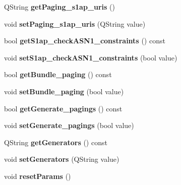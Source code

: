 \begin{DoxyCompactItemize}
\item 
Q\+String {\bfseries get\+Paging\+\_\+s1ap\+\_\+uris} ()\hypertarget{class_mme_a6144d91975d8be6b7b98890869d50aa0}{}\label{class_mme_a6144d91975d8be6b7b98890869d50aa0}

\item 
void {\bfseries set\+Paging\+\_\+s1ap\+\_\+uris} (Q\+String value)\hypertarget{class_mme_ac1810d48494dfe1fee05481bbff2b595}{}\label{class_mme_ac1810d48494dfe1fee05481bbff2b595}

\item 
bool {\bfseries get\+S1ap\+\_\+check\+A\+S\+N1\+\_\+constraints} () const \hypertarget{class_mme_ac06ce5b7fe9e9f6b692110ece42a1990}{}\label{class_mme_ac06ce5b7fe9e9f6b692110ece42a1990}

\item 
void {\bfseries set\+S1ap\+\_\+check\+A\+S\+N1\+\_\+constraints} (bool value)\hypertarget{class_mme_a630e8c6b0407e577f011a23b047130c2}{}\label{class_mme_a630e8c6b0407e577f011a23b047130c2}

\item 
bool {\bfseries get\+Bundle\+\_\+paging} () const \hypertarget{class_mme_a93121bdf9b0aefa8a26a4e2d219281e8}{}\label{class_mme_a93121bdf9b0aefa8a26a4e2d219281e8}

\item 
void {\bfseries set\+Bundle\+\_\+paging} (bool value)\hypertarget{class_mme_a3eb5c23486072e2e975fadc7d0911fe8}{}\label{class_mme_a3eb5c23486072e2e975fadc7d0911fe8}

\item 
bool {\bfseries get\+Generate\+\_\+pagings} () const \hypertarget{class_mme_af6ea4e538db1f852b94b20810f27dfa7}{}\label{class_mme_af6ea4e538db1f852b94b20810f27dfa7}

\item 
void {\bfseries set\+Generate\+\_\+pagings} (bool value)\hypertarget{class_mme_a42a31249a3e0c51c177b164855fcc848}{}\label{class_mme_a42a31249a3e0c51c177b164855fcc848}

\item 
Q\+String {\bfseries get\+Generators} () const \hypertarget{class_mme_afe11177f7eb96c21d7097b1750e3ed91}{}\label{class_mme_afe11177f7eb96c21d7097b1750e3ed91}

\item 
void {\bfseries set\+Generators} (Q\+String value)\hypertarget{class_mme_a8c75faaf58c0a33f12f68e81e886679d}{}\label{class_mme_a8c75faaf58c0a33f12f68e81e886679d}

\item 
void {\bfseries reset\+Params} ()\hypertarget{class_mme_a75c0bfe4dcb78eaa0aa6b141cfcd29a4}{}\label{class_mme_a75c0bfe4dcb78eaa0aa6b141cfcd29a4}

\end{DoxyCompactItemize}


